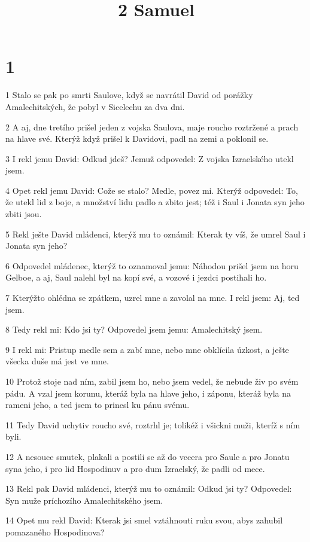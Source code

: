 

\title{2 Samuel}

\chapter{1}

\par 1 Stalo se pak po smrti Saulove, když se navrátil David od porážky Amalechitských, že pobyl v Sicelechu za dva dni.
\par 2 A aj, dne tretího prišel jeden z vojska Saulova, maje roucho roztržené a prach na hlave své. Kterýž když prišel k Davidovi, padl na zemi a poklonil se.
\par 3 I rekl jemu David: Odkud jdeš? Jemuž odpovedel: Z vojska Izraelského utekl jsem.
\par 4 Opet rekl jemu David: Cože se stalo? Medle, povez mi. Kterýž odpovedel: To, že utekl lid z boje, a množství lidu padlo a zbito jest; též i Saul i Jonata syn jeho zbiti jsou.
\par 5 Rekl ješte David mládenci, kterýž mu to oznámil: Kterak ty víš, že umrel Saul i Jonata syn jeho?
\par 6 Odpovedel mládenec, kterýž to oznamoval jemu: Náhodou prišel jsem na horu Gelboe, a aj, Saul nalehl byl na kopí své, a vozové i jezdci postihali ho.
\par 7 Kterýžto ohlédna se zpátkem, uzrel mne a zavolal na mne. I rekl jsem: Aj, ted jsem.
\par 8 Tedy rekl mi: Kdo jsi ty? Odpovedel jsem jemu: Amalechitský jsem.
\par 9 I rekl mi: Pristup medle sem a zabí mne, nebo mne obklícila úzkost, a ješte všecka duše má jest ve mne.
\par 10 Protož stoje nad ním, zabil jsem ho, nebo jsem vedel, že nebude živ po svém pádu. A vzal jsem korunu, kteráž byla na hlave jeho, i záponu, kteráž byla na rameni jeho, a ted jsem to prinesl ku pánu svému.
\par 11 Tedy David uchytiv roucho své, roztrhl je; tolikéž i všickni muži, kteríž s ním byli.
\par 12 A nesouce smutek, plakali a postili se až do vecera pro Saule a pro Jonatu syna jeho, i pro lid Hospodinuv a pro dum Izraelský, že padli od mece.
\par 13 Rekl pak David mládenci, kterýž mu to oznámil: Odkud jsi ty? Odpovedel: Syn muže príchozího Amalechitského jsem.
\par 14 Opet mu rekl David: Kterak jsi smel vztáhnouti ruku svou, abys zahubil pomazaného Hospodinova?
